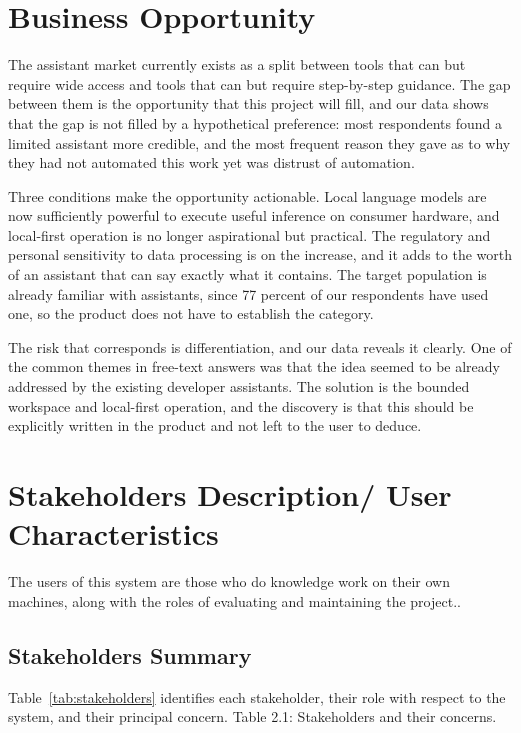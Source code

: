 \documentclass{FastFyp}
\begin{document}
\section{Business Opportunity}
The assistant market currently exists as a split between tools that can but require wide access and tools that can but require step-by-step guidance. The gap between them is the opportunity that this project will fill, and our data shows that the gap is not filled by a hypothetical preference: most respondents found a limited assistant more credible, and the most frequent reason they gave as to why they had not automated this work yet was distrust of automation.

Three conditions make the opportunity actionable. Local language models are now sufficiently powerful to execute useful inference on consumer hardware, and local-first operation is no longer aspirational but practical. The regulatory and personal sensitivity to data processing is on the increase, and it adds to the worth of an assistant that can say exactly what it contains. The target population is already familiar with assistants, since 77 percent of our respondents have used one, so the product does not have to establish the category.

The risk that corresponds is differentiation, and our data reveals it clearly. One of the common themes in free-text answers was that the idea seemed to be already addressed by the existing developer assistants. The solution is the bounded workspace and local-first operation, and the discovery is that this should be explicitly written in the product and not left to the user to deduce.

\section{Stakeholders Description/ User Characteristics}
The users of this system are those who do knowledge work on their own machines, along with the roles of evaluating and maintaining the project..

\subsection{Stakeholders Summary}
Table~\ref{tab:stakeholders} identifies each stakeholder, their role with respect to the system, and their principal concern. Table 2.1: Stakeholders and their concerns.
\end{document}

